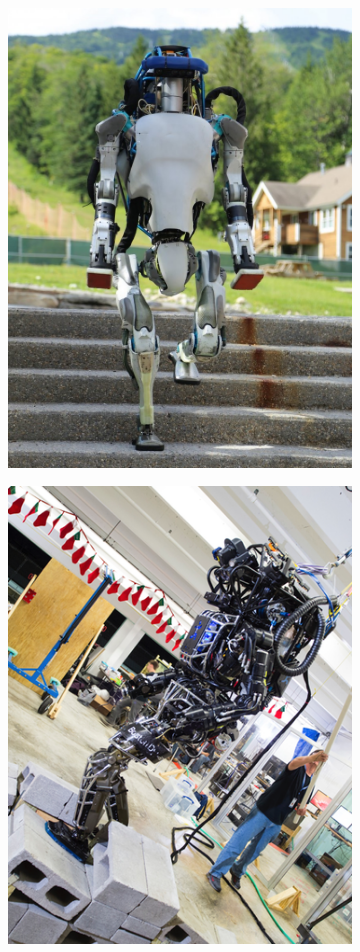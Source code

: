\begin{figure}[h]
  \begin{subfigure}{0.23\textwidth}
  \centering
  \includegraphics[width=.8\linewidth]{STYLESTUFF/AtlasNew.jpg}
   \caption{}
    \label{fig:currentrobotsa}
  \end{subfigure}
  \begin{subfigure}{0.23\textwidth}
    \centering
  \includegraphics[width=.8\linewidth]{STYLESTUFF/AtlasOld.png}

\end{subfigure}
\end{figure}
